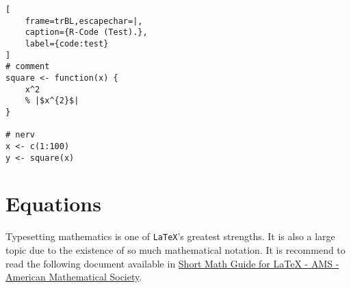 \begin{minipage}{\textwidth}
\lstset{language=R,numbers=left}
\begin{lstlisting}[
    frame=trBL,escapechar=|,
    caption={R-Code (Test).},
    label={code:test}
]
# comment
square <- function(x) {
    x^2
    % |$x^{2}$|
}

# nerv
x <- c(1:100)
y <- square(x)
\end{lstlisting}
\end{minipage}

\section{Equations}

Typesetting mathematics is one of \texttt{LaTeX}'s greatest strengths. It is also a large topic due to the existence of so much mathematical notation. It is recommend to read the following document available in \href{http://www.google.pt/url?sa=t&rct=j&q=&esrc=s&source=web&cd=1&cad=rja&ved=0CB4QFjAA&url=ftp%3A%2F%2Fftp.ams.org%2Fpub%2Ftex%2Fdoc%2Famsmath%2Fshort-math-guide.pdf&ei=DkScUOm8IJC5hAei7oGQDg&usg=AFQjCNEHl1pXuurNmXAdqfC0z-pPAbDyUw}{Short Math Guide for LaTeX - AMS - American Mathematical Society}.



